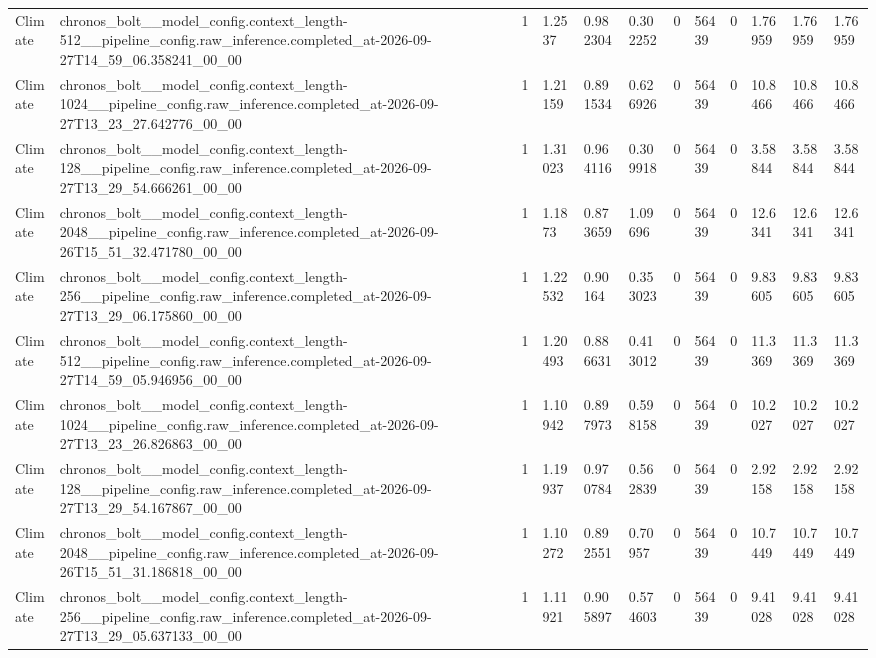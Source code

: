 \begin{tabular}{llllllllllll}
Climate & chronos\_bolt\_\_model\_config.context\_length-512\_\_pipeline\_config.raw\_inference.completed\_at-2026-09-27T14\_59\_06.358241\_00\_00 & 1 & 1.2537 & 0.982304 & 0.302252 & 0 & 56439 & 0 & 1.76959 & 1.76959 & 1.76959 \\
Climate & chronos\_bolt\_\_model\_config.context\_length-1024\_\_pipeline\_config.raw\_inference.completed\_at-2026-09-27T13\_23\_27.642776\_00\_00 & 1 & 1.21159 & 0.891534 & 0.626926 & 0 & 56439 & 0 & 10.8466 & 10.8466 & 10.8466 \\
Climate & chronos\_bolt\_\_model\_config.context\_length-128\_\_pipeline\_config.raw\_inference.completed\_at-2026-09-27T13\_29\_54.666261\_00\_00 & 1 & 1.31023 & 0.964116 & 0.309918 & 0 & 56439 & 0 & 3.58844 & 3.58844 & 3.58844 \\
Climate & chronos\_bolt\_\_model\_config.context\_length-2048\_\_pipeline\_config.raw\_inference.completed\_at-2026-09-26T15\_51\_32.471780\_00\_00 & 1 & 1.1873 & 0.873659 & 1.09696 & 0 & 56439 & 0 & 12.6341 & 12.6341 & 12.6341 \\
Climate & chronos\_bolt\_\_model\_config.context\_length-256\_\_pipeline\_config.raw\_inference.completed\_at-2026-09-27T13\_29\_06.175860\_00\_00 & 1 & 1.22532 & 0.90164 & 0.353023 & 0 & 56439 & 0 & 9.83605 & 9.83605 & 9.83605 \\
Climate & chronos\_bolt\_\_model\_config.context\_length-512\_\_pipeline\_config.raw\_inference.completed\_at-2026-09-27T14\_59\_05.946956\_00\_00 & 1 & 1.20493 & 0.886631 & 0.413012 & 0 & 56439 & 0 & 11.3369 & 11.3369 & 11.3369 \\
Climate & chronos\_bolt\_\_model\_config.context\_length-1024\_\_pipeline\_config.raw\_inference.completed\_at-2026-09-27T13\_23\_26.826863\_00\_00 & 1 & 1.10942 & 0.897973 & 0.598158 & 0 & 56439 & 0 & 10.2027 & 10.2027 & 10.2027 \\
Climate & chronos\_bolt\_\_model\_config.context\_length-128\_\_pipeline\_config.raw\_inference.completed\_at-2026-09-27T13\_29\_54.167867\_00\_00 & 1 & 1.19937 & 0.970784 & 0.562839 & 0 & 56439 & 0 & 2.92158 & 2.92158 & 2.92158 \\
Climate & chronos\_bolt\_\_model\_config.context\_length-2048\_\_pipeline\_config.raw\_inference.completed\_at-2026-09-26T15\_51\_31.186818\_00\_00 & 1 & 1.10272 & 0.892551 & 0.70957 & 0 & 56439 & 0 & 10.7449 & 10.7449 & 10.7449 \\
Climate & chronos\_bolt\_\_model\_config.context\_length-256\_\_pipeline\_config.raw\_inference.completed\_at-2026-09-27T13\_29\_05.637133\_00\_00 & 1 & 1.11921 & 0.905897 & 0.574603 & 0 & 56439 & 0 & 9.41028 & 9.41028 & 9.41028 \\

\end{tabular}
